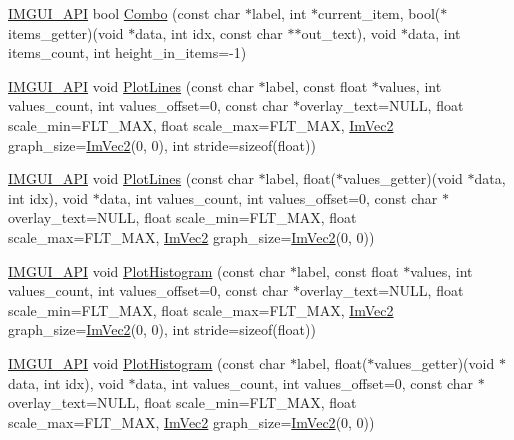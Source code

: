 \begin{DoxyCompactItemize}
\item 
\mbox{\hyperlink{imgui_8h_a43829975e84e45d1149597467a14bbf5}{I\+M\+G\+U\+I\+\_\+\+A\+PI}} bool \mbox{\hyperlink{namespace_im_gui_a65d00f64f98ccb810bdb75721612948c}{Combo}} (const char $\ast$label, int $\ast$current\+\_\+item, bool($\ast$items\+\_\+getter)(void $\ast$data, int idx, const char $\ast$$\ast$out\+\_\+text), void $\ast$data, int items\+\_\+count, int height\+\_\+in\+\_\+items=-\/1)
\item 
\mbox{\hyperlink{imgui_8h_a43829975e84e45d1149597467a14bbf5}{I\+M\+G\+U\+I\+\_\+\+A\+PI}} void \mbox{\hyperlink{namespace_im_gui_a2bc21c56e4796855313804086cca114f}{Plot\+Lines}} (const char $\ast$label, const float $\ast$values, int values\+\_\+count, int values\+\_\+offset=0, const char $\ast$overlay\+\_\+text=N\+U\+LL, float scale\+\_\+min=F\+L\+T\+\_\+\+M\+AX, float scale\+\_\+max=F\+L\+T\+\_\+\+M\+AX, \mbox{\hyperlink{struct_im_vec2}{Im\+Vec2}} graph\+\_\+size=\mbox{\hyperlink{struct_im_vec2}{Im\+Vec2}}(0, 0), int stride=sizeof(float))
\item 
\mbox{\hyperlink{imgui_8h_a43829975e84e45d1149597467a14bbf5}{I\+M\+G\+U\+I\+\_\+\+A\+PI}} void \mbox{\hyperlink{namespace_im_gui_a94a2645d45c96da35b834dc7db93a9f1}{Plot\+Lines}} (const char $\ast$label, float($\ast$values\+\_\+getter)(void $\ast$data, int idx), void $\ast$data, int values\+\_\+count, int values\+\_\+offset=0, const char $\ast$overlay\+\_\+text=N\+U\+LL, float scale\+\_\+min=F\+L\+T\+\_\+\+M\+AX, float scale\+\_\+max=F\+L\+T\+\_\+\+M\+AX, \mbox{\hyperlink{struct_im_vec2}{Im\+Vec2}} graph\+\_\+size=\mbox{\hyperlink{struct_im_vec2}{Im\+Vec2}}(0, 0))
\item 
\mbox{\hyperlink{imgui_8h_a43829975e84e45d1149597467a14bbf5}{I\+M\+G\+U\+I\+\_\+\+A\+PI}} void \mbox{\hyperlink{namespace_im_gui_af7a92b2118981835b5251bfdaac50252}{Plot\+Histogram}} (const char $\ast$label, const float $\ast$values, int values\+\_\+count, int values\+\_\+offset=0, const char $\ast$overlay\+\_\+text=N\+U\+LL, float scale\+\_\+min=F\+L\+T\+\_\+\+M\+AX, float scale\+\_\+max=F\+L\+T\+\_\+\+M\+AX, \mbox{\hyperlink{struct_im_vec2}{Im\+Vec2}} graph\+\_\+size=\mbox{\hyperlink{struct_im_vec2}{Im\+Vec2}}(0, 0), int stride=sizeof(float))
\item 
\mbox{\hyperlink{imgui_8h_a43829975e84e45d1149597467a14bbf5}{I\+M\+G\+U\+I\+\_\+\+A\+PI}} void \mbox{\hyperlink{namespace_im_gui_af8089203baf8cf723a158c9e34bda2a4}{Plot\+Histogram}} (const char $\ast$label, float($\ast$values\+\_\+getter)(void $\ast$data, int idx), void $\ast$data, int values\+\_\+count, int values\+\_\+offset=0, const char $\ast$overlay\+\_\+text=N\+U\+LL, float scale\+\_\+min=F\+L\+T\+\_\+\+M\+AX, float scale\+\_\+max=F\+L\+T\+\_\+\+M\+AX, \mbox{\hyperlink{struct_im_vec2}{Im\+Vec2}} graph\+\_\+size=\mbox{\hyperlink{struct_im_vec2}{Im\+Vec2}}(0, 0))
$$
\end{DoxyCompactItemize}
